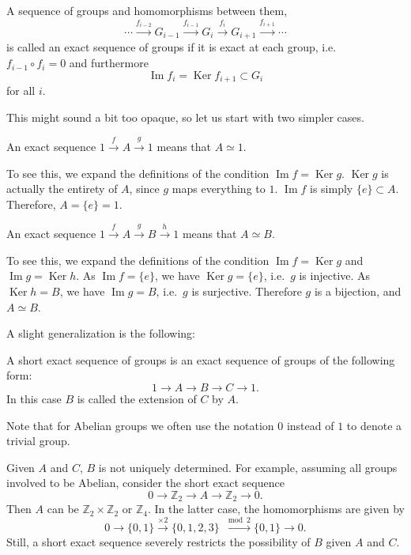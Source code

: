 \documentclass[12pt]{article}
\numberwithin{equation}{section}
\numberwithin{figure}{section}
\theoremstyle{remark}
\def\bZ{\mathbb{Z}}
\def\Ker{\mathop{\mathrm{Ker}}}
\def\Im{\mathop{\mathrm{Im}}}
\begin{document}
\begin{definition}
  A sequence of groups and homomorphisms between them, \begin{equation}
  \cdots 
  \stackrel{f_{i-2}}{\longrightarrow} G_{i-1} 
  \stackrel{f_{i-1}}{\longrightarrow} G_{i}
  \stackrel{f_{i}}{\longrightarrow} G_{i+1}
  \stackrel{f_{i+1}}{\longrightarrow} \cdots
  \end{equation}
is called an exact sequence of groups if it is exact at each group, i.e.~
$f_{i-1}\circ f_i=0$ and furthermore 
\begin{equation}
 \Im f_{i}  = \Ker f_{i+1} \subset G_i \label{eq:exactness}
\end{equation}
for all $i$.
\end{definition}

This might sound a bit too opaque, so let us start with two simpler cases.
\begin{proposition}
  An exact sequence $1\stackrel{f}{\to} A\stackrel{g}{\to} 1$ means that $A\simeq 1$.
\end{proposition}
To see this, we expand the definitions of the condition $\Im f=\Ker g$.
$\Ker g$ is actually the entirety of $A$, since $g$ maps everything to $1$.
$\Im f$ is simply $\{e\}\subset A$.
Therefore, $A=\{e\}=1$.

\begin{proposition}
An exact sequence $1\stackrel{f}{\to} A\stackrel{g}{\to} B\stackrel{h}{\to} 1$ means that $A\simeq B$.
\end{proposition}
To see this, we expand the definitions of the condition $\Im f=\Ker g$ and $\Im g=\Ker h$.
As $\Im f=\{e\}$, we have $\Ker g=\{e\}$, i.e.~$g$ is injective.
As $\Ker h=B$, we have $\Im g=B$, i.e.~$g$ is surjective.
Therefore $g$ is a bijection, and $A\simeq B$.


A slight generalization is the following:
\begin{definition}
  A short exact sequence of groups is an exact sequence of groups of the following form: \begin{equation}
  1 \to A \to B \to C \to 1.
  \end{equation}
  In this case $B$ is called the extension of $C$ by $A$.
\end{definition}
Note that for Abelian groups we often use the notation $0$ instead of $1$
to denote a trivial group.

Given $A$ and $C$, $B$ is not uniquely determined.
For example, assuming all groups involved to be Abelian,
consider the short exact sequence \begin{equation}
  0 \to \bZ_2 \to A \to \bZ_2 \to 0.
\end{equation}  
Then $A$ can be $\bZ_2\times \bZ_2$ or $\bZ_4$.
In the latter case, the homomorphisms are given by \begin{equation}
0 \to \{0,1\} \xrightarrow{\times 2} \{0,1,2,3\} \xrightarrow{\mod 2} \{0,1\} \to 0.
\end{equation}
Still, a short exact sequence severely restricts the possibility of $B$ given $A$ and $C$.
\end{document}
